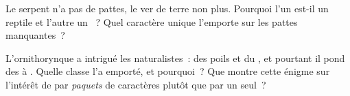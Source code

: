 \begin{exercise}[$\star\star$]\label{exo:g4:classifying-animals:10}
Le serpent n'a pas de pattes, le ver de terre non plus. Pourquoi
l'un est-il un reptile  et l'autre un ~? Quel
caractère unique l'emporte sur les pattes manquantes~?
\end{exercise}

\begin{exercise}[$\star\star\star$]\label{exo:g4:classifying-animals:11}
L'ornithorynque a intrigué les naturalistes~: des poils et du ,
et pourtant il pond des  à . Quelle classe l'a emporté,
et pourquoi~? Que montre cette énigme sur l'intérêt de  par
\emph{paquets} de caractères plutôt que par un seul~?
\end{exercise}
